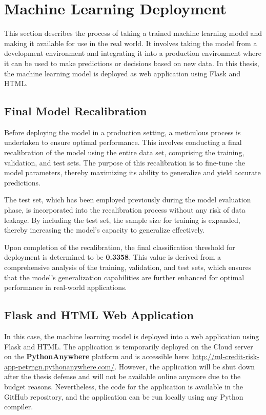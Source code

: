 \newpage
\section{Machine Learning Deployment}
\label{sec:deployment}
This section describes the process of taking a trained machine learning model and making it available for use in the real world. It involves taking the model from a development environment and integrating it into a production environment where it can be used to make predictions or decisions based on new data. In this thesis, the machine learning model is deployed as web application using Flask and HTML.
\subsection{Final Model Recalibration}
Before deploying the model in a production setting, a meticulous process is undertaken to ensure optimal performance.
This involves conducting a final recalibration of the model using the entire data set, comprising the training, validation, and test sets.
The purpose of this recalibration is to fine-tune the model parameters, thereby maximizing its ability to generalize and yield accurate predictions.

The test set, which has been employed previously during the model evaluation phase, is incorporated into the recalibration process without any risk of data leakage.
By including the test set, the sample size for training is expanded, thereby increasing the model's capacity to generalize effectively.

Upon completion of the recalibration, the final classification threshold for deployment is determined to be \textbf{0.3358}.
This value is derived from a comprehensive analysis of the training, validation, and test sets, which ensures that the model's generalization capabilities are further enhanced for optimal performance in real-world applications.

\subsection{Flask and HTML Web Application}
\label{subsec:flaskapp}

In this case, the machine learning model is deployed into a web application using Flask and HTML. The application is temporarily deployed on the Cloud server on the \textbf{PythonAnywhere} platform and is accessible here: \url{http://ml-credit-risk-app-petrngn.pythonanywhere.com/}.
However, the application will be shut down after the thesis defense and will not be available online anymore due to the budget reasons.
Nevertheless, the code for the application is available in the GitHub repository, and the application can be run locally using any Python compiler.

